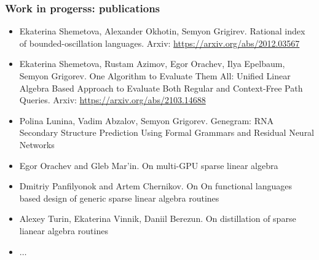 \documentclass[xcolor=table, aspectratio=169]{beamer}
\begin{document}
\begin{frame}[fragile]

\frametitle{Work in progerss: publications}
\begin{itemize}
      \item[\faHourglassHalf] Ekaterina Shemetova, Alexander Okhotin, Semyon Grigirev. Rational index of bounded-oscillation languages. Arxiv: \url{https://arxiv.org/abs/2012.03567}
      
      \item[\faHourglassHalf] Ekaterina Shemetova, Rustam Azimov, Egor Orachev, Ilya Epelbaum, Semyon Grigorev. One Algorithm to Evaluate Them All: Unified Linear Algebra Based Approach to Evaluate Both Regular and Context-Free Path Queries. Arxiv: \url{https://arxiv.org/abs/2103.14688}
      \item[\faHourglassHalf] Polina Lunina, Vadim Abzalov, Semyon Grigorev. Genegram: RNA Secondary Structure       Prediction Using Formal Grammars and Residual Neural Networks
      \pause
      \item[\faGears] Egor Orachev and Gleb Mar'in. On multi-GPU sparse linear algebra
      \item[\faGears] Dmitriy Panfilyonok and Artem Chernikov. On On functional languages based design of generic sparse linear algebra routines 
      \item[\faGears] Alexey Turin, Ekaterina Vinnik, Daniil Berezun. On distillation of sparse lianear algebra routines
      \item[\faGears] $\ldots$
\end{itemize}
\end{frame}
\end{document}
